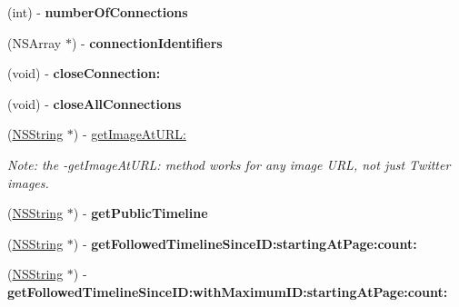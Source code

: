 \begin{DoxyCompactItemize}
\item 
\hypertarget{interface_m_g_twitter_engine_a1f651b8109cc99e3186e3deef1392d3e}{
(int) -\/ {\bfseries number\-Of\-Connections}}
\label{interface_m_g_twitter_engine_a1f651b8109cc99e3186e3deef1392d3e}

\item 
\hypertarget{interface_m_g_twitter_engine_a3adad631ab6cf30a5868cf14f28e7d5f}{
(\-N\-S\-Array $\ast$) -\/ {\bfseries connection\-Identifiers}}
\label{interface_m_g_twitter_engine_a3adad631ab6cf30a5868cf14f28e7d5f}

\item 
\hypertarget{interface_m_g_twitter_engine_a4beaf602b3bd433ec2e690eecead4457}{
(void) -\/ {\bfseries close\-Connection\-:}}
\label{interface_m_g_twitter_engine_a4beaf602b3bd433ec2e690eecead4457}

\item 
\hypertarget{interface_m_g_twitter_engine_af4374d16b5f4a31450772ab90eca110b}{
(void) -\/ {\bfseries close\-All\-Connections}}
\label{interface_m_g_twitter_engine_af4374d16b5f4a31450772ab90eca110b}

\item 
\hypertarget{interface_m_g_twitter_engine_aa96adc9abc7d1f07330891a06478f977}{
(\hyperlink{class_n_s_string}{\-N\-S\-String} $\ast$) -\/ \hyperlink{interface_m_g_twitter_engine_aa96adc9abc7d1f07330891a06478f977}{get\-Image\-At\-U\-R\-L\-:}}
\label{interface_m_g_twitter_engine_aa96adc9abc7d1f07330891a06478f977}

\begin{DoxyCompactList}\small\item\em \-Note\-: the -\/get\-Image\-At\-U\-R\-L\-: method works for any image \-U\-R\-L, not just \-Twitter images. \end{DoxyCompactList}\item 
\hypertarget{interface_m_g_twitter_engine_a527d97598a9c34af1f667260a4175173}{
(\hyperlink{class_n_s_string}{\-N\-S\-String} $\ast$) -\/ {\bfseries get\-Public\-Timeline}}
\label{interface_m_g_twitter_engine_a527d97598a9c34af1f667260a4175173}

\item 
\hypertarget{interface_m_g_twitter_engine_a8a40d534561bffabb34490c6e2dcc85e}{
(\hyperlink{class_n_s_string}{\-N\-S\-String} $\ast$) -\/ {\bfseries get\-Followed\-Timeline\-Since\-I\-D\-:starting\-At\-Page\-:count\-:}}
\label{interface_m_g_twitter_engine_a8a40d534561bffabb34490c6e2dcc85e}

\item 
\hypertarget{interface_m_g_twitter_engine_a34c0ba6dea70bb23981e638c04892298}{
(\hyperlink{class_n_s_string}{\-N\-S\-String} $\ast$) -\/ {\bfseries get\-Followed\-Timeline\-Since\-I\-D\-:with\-Maximum\-I\-D\-:starting\-At\-Page\-:count\-:}}
\label{interface_m_g_twitter_engine_a34c0ba6dea70bb23981e638c04892298}


\end{DoxyCompactItemize}
